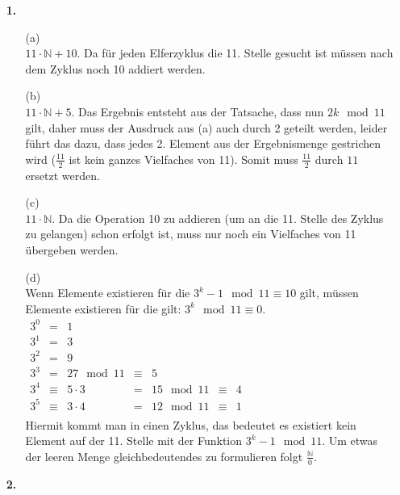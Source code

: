 \documentclass[a4paper,11pt,fleqn]{scrartcl}
\title{\titleinfo}
\author{\authorinfo}
\begin{document}
	\maketitle
	\begin{enumerate}
		\item[\textbf{1.}]
		\begin{enumerate}
			\item[(a)]\quad \\
				\(11 \cdot \mathbb{N} + 10\). Da für jeden Elferzyklus die 11. Stelle gesucht ist müssen nach dem Zyklus noch 10 
				addiert werden.
			\item[(b)]\quad \\
				\(11 \cdot \mathbb{N} + 5\). Das Ergebnis entsteht aus der Tatsache, dass nun \(2k \mod 11\) gilt, daher muss
				der Ausdruck aus (a) auch durch 2 geteilt werden, leider führt das dazu, dass jedes 2. Element aus der 
				Ergebnismenge gestrichen wird (\(\frac{11}{2}\) ist kein ganzes Vielfaches von 11). Somit muss \(\frac{11}{2}\) 
				durch \(11\) ersetzt werden.
			\item[(c)]\quad \\
				\(11 \cdot \mathbb{N}\). Da die Operation 10 zu addieren (um an die 11. Stelle des Zyklus zu gelangen) schon 
				erfolgt ist, muss nur noch ein Vielfaches von 11 übergeben werden.
			\item[(d)]\quad \\
				Wenn Elemente existieren für die \(3^k - 1 \mod 11 \equiv 10\) gilt, müssen Elemente existieren für die gilt: 
				\(3^k \mod 11 \equiv 0\). \\
				\(
				\begin{array}{rclclcl}
					3^0 &=& 1 \\
					3^1 &=& 3 \\
					3^2 &=& 9 \\
					3^3 &=& 27 \mod 11 &\equiv & 5 \\
					3^4 &\equiv & 5 \cdot 3 &=& 15 \mod 11 &\equiv & 4 \\
					3^5 &\equiv & 3 \cdot 4 &=& 12 \mod 11 &\equiv & 1 \\
				\end{array}
				\) \\
				Hiermit kommt man in einen Zyklus, das bedeutet es existiert kein Element auf der 11. Stelle mit der Funktion
				\(3^k - 1 \mod 11\). Um etwas der leeren Menge gleichbedeutendes zu formulieren folgt \(\frac{\mathbb{N}}{0}\).
		\end{enumerate}
		\item[\textbf{2.}]\quad \\

\end{enumerate}
\end{document}
